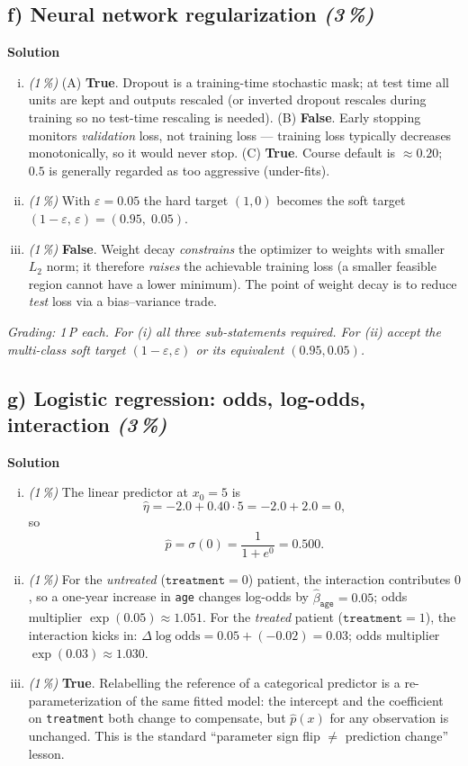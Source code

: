 \documentclass[11pt,a4paper]{article}
\newcommand{\subpoints}[1]{\textit{(#1\,\%)}}
\newcommand{\sol}{\noindent\textbf{Solution}}
\begin{document}
\subsection*{f) Neural network regularization \subpoints{3}}
\sol{}
\begin{enumerate}[(i)]
  \item \subpoints{1} (A) \textbf{True}. Dropout is a training-time stochastic mask; at test time
        all units are kept and outputs rescaled (or inverted dropout rescales during training so
        no test-time rescaling is needed). (B) \textbf{False}. Early stopping monitors
        \emph{validation} loss, not training loss --- training loss typically decreases
        monotonically, so it would never stop. (C) \textbf{True}. Course default is $\approx 0.20$;
        $0.5$ is generally regarded as too aggressive (under-fits).
  \item \subpoints{1} With $\varepsilon = 0.05$ the hard target $(1, 0)$ becomes the soft target
        $(1 - \varepsilon,\, \varepsilon) = \boxed{(0.95,\; 0.05)}$.
  \item \subpoints{1} \textbf{False}. Weight decay \emph{constrains} the optimizer to weights with
        smaller $L_2$ norm; it therefore \emph{raises} the achievable training loss (a smaller
        feasible region cannot have a lower minimum). The point of weight decay is to reduce
        \emph{test} loss via a bias--variance trade.
\end{enumerate}

\noindent\emph{Grading: 1\,P each. For (i) all three sub-statements required. For (ii) accept the
multi-class soft target $(1 - \varepsilon, \varepsilon)$ or its equivalent $(0.95, 0.05)$.}

\subsection*{g) Logistic regression: odds, log-odds, interaction \subpoints{3}}
\sol{}
\begin{enumerate}[(i)]
  \item \subpoints{1} The linear predictor at $x_0 = 5$ is
        $$\hat\eta = -2.0 + 0.40\cdot 5 = -2.0 + 2.0 = 0,$$
        so
        $$\hat p = \sigma(0) = \frac{1}{1 + e^{0}} = \boxed{0.500}.$$
  \item \subpoints{1} For the \emph{untreated} ($\texttt{treatment}=0$) patient, the interaction
        contributes $0$, so a one-year increase in \texttt{age} changes log-odds by
        $\hat\beta_{\texttt{age}} = 0.05$; odds multiplier $\exp(0.05) \approx \boxed{1.051}$.
        For the \emph{treated} patient ($\texttt{treatment}=1$), the interaction kicks in:
        $\Delta\log\text{odds} = 0.05 + (-0.02) = 0.03$; odds multiplier
        $\exp(0.03) \approx \boxed{1.030}$.
  \item \subpoints{1} \textbf{True}. Relabelling the reference of a categorical predictor is a
        re-parameterization of the same fitted model: the intercept and the coefficient on
        \texttt{treatment} both change to compensate, but $\hat p(x)$ for any observation is
        unchanged. This is the standard ``parameter sign flip $\neq$ prediction change'' lesson.
\end{enumerate}
\end{document}
